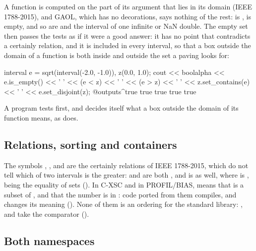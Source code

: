 A function is computed on the part of its argument that lies in its domain
(IEEE 1788-2015), and GAOL, which has no decorations, says nothing of the
rest:  is , 
is empty, and so are  and the interval of one infinite
or NaN double. The empty set then passes the tests as if it were a good
answer: it has no point that contradicts a certainly relation, and it is
included in every interval, so that a box outside the domain of a function is
both inside and outside the set a paving looks for:

\begin{example}
interval e = sqrt(interval(-2.0, -1.0)), z(0.0, 1.0);
cout << boolalpha << e.is_empty() << ' ' << (e < z) << ' '
     << (e > z) << ' ' << z.set_contains(e) << ' '
     << e.set_disjoint(z);
@outputs^true true true true true~
\end{example}

\noindent
A program tests  first, and decides itself what a box
outside the domain of its function means, as 
does.\newinvfive

\subsection{Relations, sorting and containers}
%

The symbols \code{<}, \code{<=}, \code{>} and \code{>=} are the certainly
relations of IEEE 1788-2015, which do not tell which of two intervals is the
greater:  and
 are both , and
 is  as well, where
 is , \code{==} being the
equality of sets (). In C-XSC and in PROFIL/BIAS, 
means that  is a subset of , and  that the number
 is in : code ported from them compiles, and changes its
meaning (). None of them is an ordering for the
standard library: ,  and  take
the comparator 
().\newinvfive

\subsection{Both namespaces}

